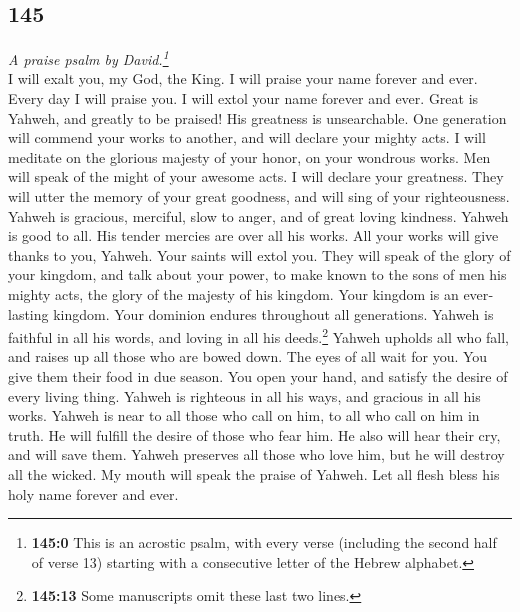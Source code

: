 \begin{paracol}{2}
\switchcolumn
\begin{otherlanguage}{english}

\hypertarget{section-289}{%
\section{145}\label{section-289}}

\emph{A praise psalm by David.\footnote{\textbf{145:0} This is an
  acrostic psalm, with every verse (including the second half of verse
  13) starting with a consecutive letter of the Hebrew alphabet.}}\\
 I will exalt you, my God, the King. I will praise your
name forever and ever.  Every day I will praise you. I
will extol your name forever and ever.  Great is Yahweh,
and greatly to be praised! His greatness is unsearchable. 
One generation will commend your works to another, and will declare your
mighty acts.  I will meditate on the glorious majesty of
your honor, on your wondrous works.  Men will speak of the
might of your awesome acts. I will declare your greatness.
 They will utter the memory of your great goodness, and
will sing of your righteousness.  Yahweh is gracious,
merciful, slow to anger, and of great loving kindness. 
Yahweh is good to all. His tender mercies are over all his works.
 All your works will give thanks to you, Yahweh. Your
saints will extol you.  They will speak of the glory of
your kingdom, and talk about your power,  to make known
to the sons of men his mighty acts, the glory of the majesty of his
kingdom.  Your kingdom is an everlasting kingdom. Your
dominion endures throughout all generations. Yahweh is faithful in all
his words, and loving in all his deeds.\footnote{\textbf{145:13} Some
  manuscripts omit these last two lines.}  Yahweh upholds
all who fall, and raises up all those who are bowed down.
 The eyes of all wait for you. You give them their food
in due season.  You open your hand, and satisfy the
desire of every living thing.  Yahweh is righteous in all
his ways, and gracious in all his works.  Yahweh is near
to all those who call on him, to all who call on him in truth.
 He will fulfill the desire of those who fear him. He
also will hear their cry, and will save them.  Yahweh
preserves all those who love him, but he will destroy all the wicked.
 My mouth will speak the praise of Yahweh. Let all flesh
bless his holy name forever and ever.


\end{otherlanguage}
\end{paracol}
